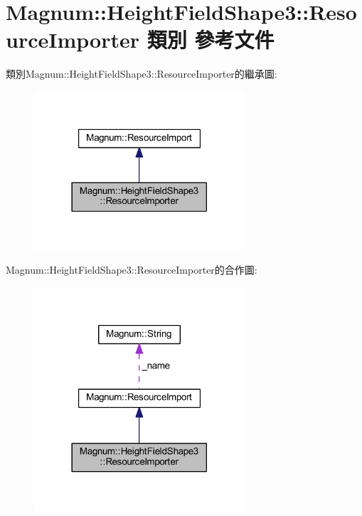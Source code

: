\hypertarget{class_magnum_1_1_height_field_shape3_1_1_resource_importer}{}\section{Magnum\+:\+:Height\+Field\+Shape3\+:\+:Resource\+Importer 類別 參考文件}
\label{class_magnum_1_1_height_field_shape3_1_1_resource_importer}


類別\+Magnum\+:\+:Height\+Field\+Shape3\+:\+:Resource\+Importer的繼承圖\+:\nopagebreak
\begin{figure}[H]
\begin{center}
\leavevmode
\includegraphics[width=222pt]{class_magnum_1_1_height_field_shape3_1_1_resource_importer__inherit__graph}
\end{center}
\end{figure}


Magnum\+:\+:Height\+Field\+Shape3\+:\+:Resource\+Importer的合作圖\+:\nopagebreak
\begin{figure}[H]
\begin{center}
\leavevmode
\includegraphics[width=222pt]{class_magnum_1_1_height_field_shape3_1_1_resource_importer__coll__graph}
\end{center}
\end{figure}
